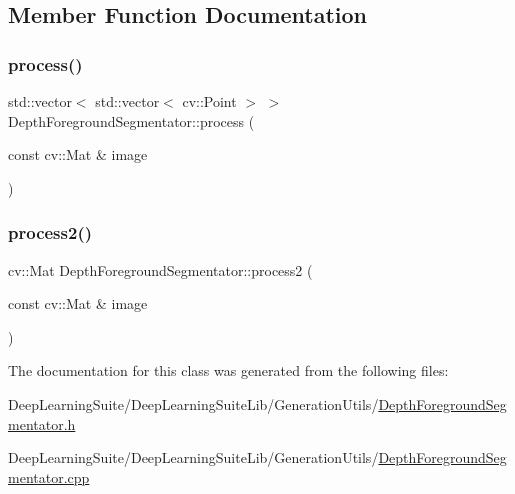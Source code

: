 \subsection{Member Function Documentation}
\mbox{\label{class_depth_foreground_segmentator_a7ad8701ffcce41cf71694f02bbb5f40d}} 
\subsubsection{\texorpdfstring{process()}{process()}}
{\footnotesize\ttfamily std\+::vector$<$ std\+::vector$<$ cv\+::\+Point $>$ $>$ Depth\+Foreground\+Segmentator\+::process (\begin{DoxyParamCaption}\item[{const cv\+::\+Mat \&}]{image }\end{DoxyParamCaption})}

\mbox{\label{class_depth_foreground_segmentator_ade5b418f591506a2e10bd05151d828c2}} 
\subsubsection{\texorpdfstring{process2()}{process2()}}
{\footnotesize\ttfamily cv\+::\+Mat Depth\+Foreground\+Segmentator\+::process2 (\begin{DoxyParamCaption}\item[{const cv\+::\+Mat \&}]{image }\end{DoxyParamCaption})}



The documentation for this class was generated from the following files\+:\begin{DoxyCompactItemize}
\item 
Deep\+Learning\+Suite/\+Deep\+Learning\+Suite\+Lib/\+Generation\+Utils/\hyperlink{_depth_foreground_segmentator_8h}{Depth\+Foreground\+Segmentator.\+h}\item 
Deep\+Learning\+Suite/\+Deep\+Learning\+Suite\+Lib/\+Generation\+Utils/\hyperlink{_depth_foreground_segmentator_8cpp}{Depth\+Foreground\+Segmentator.\+cpp}\end{DoxyCompactItemize}

